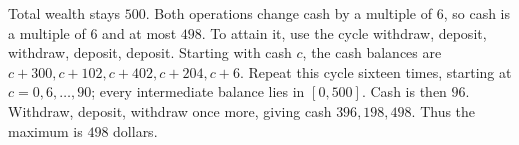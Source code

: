 Total wealth stays $500$. Both operations change cash by a multiple of $6$, so cash is a multiple of $6$ and at most $498$. To attain it, use the cycle withdraw, deposit, withdraw, deposit, deposit. Starting with cash $c$, the cash balances are $c+300,c+102,c+402,c+204,c+6$. Repeat this cycle sixteen times, starting at $c=0,6,\ldots,90$; every intermediate balance lies in $[0,500]$. Cash is then $96$. Withdraw, deposit, withdraw once more, giving cash $396,198,498$. Thus the maximum is $\boxed{498}$ dollars.
